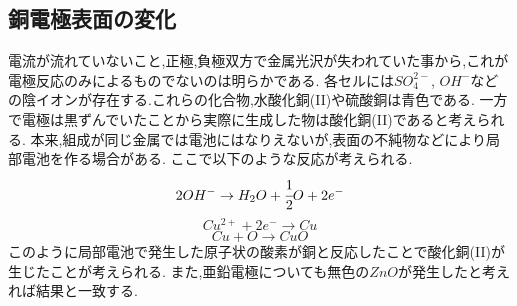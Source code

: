 \subsection{銅電極表面の変化}
電流が流れていないこと,正極,負極双方で金属光沢が失われていた事から,これが電極反応のみによるものでないのは明らかである.
各セルには$SO_4^{2-}$, $OH^{-}$などの陰イオンが存在する.これらの化合物,水酸化銅(II)や硫酸銅は青色である.
一方で電極は黒ずんでいたことから実際に生成した物は酸化銅(II)であると考えられる.
本来,組成が同じ金属では電池にはなりえないが,表面の不純物などにより局部電池を作る場合がある\cite{1961166}\cite{alma99403791704031}.
ここで以下のような反応が考えられる.
\begin{equation*}
  \label{equ:youkyoku}
  2OH^{-} \rightarrow H_2O + \cfrac{1}{2}O + 2e^{-}
\end{equation*}
\begin{equation*}
  \label{hukyoku}
  Cu^{2+} + 2e^{-} \rightarrow Cu
\end{equation*}
\begin{equation*}
  Cu + O \rightarrow CuO
\end{equation*}
このように局部電池で発生した原子状の酸素が銅と反応したことで酸化銅(II)が生じたことが考えられる.
また,亜鉛電極についても無色の$ZnO$が発生したと考えれば結果と一致する.

